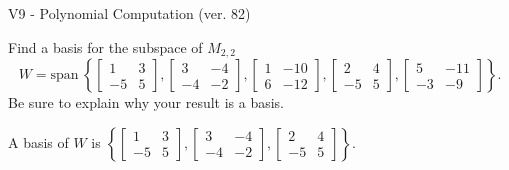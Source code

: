 \begin{exercise}
  \begin{exerciseTitle}V9 - Polynomial Computation (ver. 82)\end{exerciseTitle}
  \begin{exerciseStatement}
    Find a basis for the subspace of \(M_{2,2}\) 
\[W=\mathrm{span}\ \left\{\left[\begin{array}{cc}
1 & 3 \\
-5 & 5
\end{array}\right] , \left[\begin{array}{cc}
3 & -4 \\
-4 & -2
\end{array}\right] , \left[\begin{array}{cc}
1 & -10 \\
6 & -12
\end{array}\right] , \left[\begin{array}{cc}
2 & 4 \\
-5 & 5
\end{array}\right] , \left[\begin{array}{cc}
5 & -11 \\
-3 & -9
\end{array}\right]\right\}.\]
 Be sure to explain why your result is a basis.


  \end{exerciseStatement}
  \begin{exerciseAnswer}
   A basis of \(W\) is  \(\left\{\left[\begin{array}{cc}
1 & 3 \\
-5 & 5
\end{array}\right] , \left[\begin{array}{cc}
3 & -4 \\
-4 & -2
\end{array}\right] , \left[\begin{array}{cc}
2 & 4 \\
-5 & 5
\end{array}\right]\right\}\).
  


  \end{exerciseAnswer}
\end{exercise}
